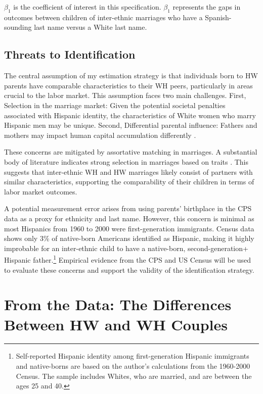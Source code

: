 \documentclass[a4paper,fleqn]{cas-sc}
\begin{document}
$\beta_{1}$ is the coefficient of interest in this specification. $\beta_{1}$ represents the gaps in outcomes between children of inter-ethnic marriages who have a Spanish-sounding last name versus a White last name. 

\subsection{Threats to Identification}

The central assumption of my estimation strategy is that individuals born to HW parents have comparable characteristics to their WH peers, particularly in areas crucial to the labor market. This assumption faces two main challenges. First, Selection in the marriage market: Given the potential societal penalties associated with Hispanic identity, the characteristics of White women who marry Hispanic men may be unique. Second, Differential parental influence: Fathers and mothers may impact human capital accumulation differently \citep{kimball2009risk,magruder2010intergenerational}.

These concerns are mitigated by assortative matching in marriages. A substantial body of literature indicates strong selection in marriages based on traits \citep{averettBetterWorseRelationship2008, beckerTreatiseFamily1993,duncanIntermarriageIntergenerationalTransmission2011}. This suggests that inter-ethnic WH and HW marriages likely consist of partners with similar characteristics, supporting the comparability of their children in terms of labor market outcomes.

A potential measurement error arises from using parents' birthplace in the CPS data as a proxy for ethnicity and last name. However, this concern is minimal as most Hispanics from 1960 to 2000 were first-generation immigrants. Census data shows only 3\% of native-born Americans identified as Hispanic, making it highly improbable for an inter-ethnic child to have a native-born, second-generation+ Hispanic father.\footnote{Self-reported Hispanic identity among first-generation Hispanic immigrants and native-borns are based on the author’s calculations from the 1960-2000 Census. The sample includes Whites, who are married, and are between the ages 25 and 40.} Empirical evidence from the CPS and US Census will be used to evaluate these concerns and support the validity of the identification strategy.

\section{From the Data: The Differences Between HW and WH Couples}\label{sec:hw-wh-couples-data}
\end{document}
